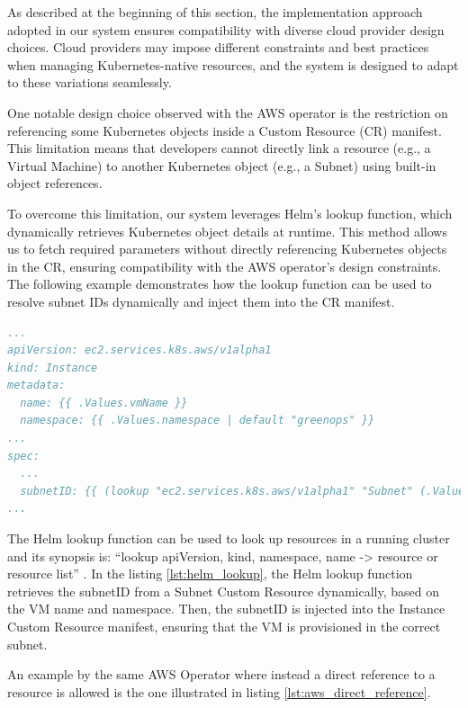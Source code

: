 As described at the beginning of this section, the implementation approach adopted in our system ensures compatibility with diverse cloud provider design choices. Cloud providers may impose different constraints and best practices when managing Kubernetes-native resources, and the system is designed to adapt to these variations seamlessly.

One notable design choice observed with the AWS operator is the restriction on referencing some Kubernetes objects inside a Custom Resource (CR) manifest. This limitation means that developers cannot directly link a resource (e.g., a Virtual Machine) to another Kubernetes object (e.g., a Subnet) using built-in object references.

To overcome this limitation, our system leverages Helm’s lookup function, which dynamically retrieves Kubernetes object details at runtime. This method allows us to fetch required parameters without directly referencing Kubernetes objects in the CR, ensuring compatibility with the AWS operator’s design constraints. The following example demonstrates how the lookup function can be used to resolve subnet IDs dynamically and inject them into the CR manifest. \\

\begin{lstlisting}[language=yaml, caption={Helm Lookup example: dynamically resolving SubnetIDs}, label={lst:helm_lookup}]
...
apiVersion: ec2.services.k8s.aws/v1alpha1
kind: Instance
metadata:
  name: {{ .Values.vmName }}
  namespace: {{ .Values.namespace | default "greenops" }}
...
spec:
  ...
  subnetID: {{ (lookup "ec2.services.k8s.aws/v1alpha1" "Subnet" (.Values.namespace | default "greenops") (printf "%s-subnet" .Values.vmName)).status.subnetID }}
...
\end{lstlisting}

The Helm lookup function can be used to look up resources in a running cluster and its synopsis is: ``lookup apiVersion, kind, namespace, name -> resource or resource list'' \cite{helm_lookup}.
In the listing \ref{lst:helm_lookup}, the Helm lookup function retrieves the subnetID from a Subnet Custom Resource dynamically, based on the VM name and namespace. Then, the subnetID is injected into the Instance Custom Resource manifest, ensuring that the VM is provisioned in the correct subnet.

An example by the same AWS Operator where instead a direct reference to a resource is allowed is the one illustrated in listing \ref{lst:aws_direct_reference}. \\

